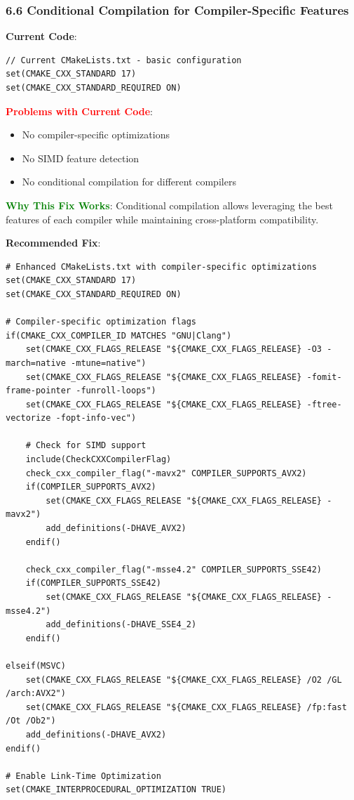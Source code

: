 \documentclass[11pt,a4paper]{article}
\begin{document}
\subsubsection{6.6 Conditional Compilation for Compiler-Specific Features}

\textbf{Current Code}:
\begin{lstlisting}
// Current CMakeLists.txt - basic configuration
set(CMAKE_CXX_STANDARD 17)
set(CMAKE_CXX_STANDARD_REQUIRED ON)
\end{lstlisting}

\textcolor{red}{\textbf{Problems with Current Code}}:
\begin{itemize}
    \item No compiler-specific optimizations
    \item No SIMD feature detection
    \item No conditional compilation for different compilers
\end{itemize}

\textcolor{green}{\textbf{Why This Fix Works}}: Conditional compilation allows leveraging the best features of each compiler while maintaining cross-platform compatibility.

\textbf{Recommended Fix}:
\begin{lstlisting}
# Enhanced CMakeLists.txt with compiler-specific optimizations
set(CMAKE_CXX_STANDARD 17)
set(CMAKE_CXX_STANDARD_REQUIRED ON)

# Compiler-specific optimization flags
if(CMAKE_CXX_COMPILER_ID MATCHES "GNU|Clang")
    set(CMAKE_CXX_FLAGS_RELEASE "${CMAKE_CXX_FLAGS_RELEASE} -O3 -march=native -mtune=native")
    set(CMAKE_CXX_FLAGS_RELEASE "${CMAKE_CXX_FLAGS_RELEASE} -fomit-frame-pointer -funroll-loops")
    set(CMAKE_CXX_FLAGS_RELEASE "${CMAKE_CXX_FLAGS_RELEASE} -ftree-vectorize -fopt-info-vec")
    
    # Check for SIMD support
    include(CheckCXXCompilerFlag)
    check_cxx_compiler_flag("-mavx2" COMPILER_SUPPORTS_AVX2)
    if(COMPILER_SUPPORTS_AVX2)
        set(CMAKE_CXX_FLAGS_RELEASE "${CMAKE_CXX_FLAGS_RELEASE} -mavx2")
        add_definitions(-DHAVE_AVX2)
    endif()
    
    check_cxx_compiler_flag("-msse4.2" COMPILER_SUPPORTS_SSE42)
    if(COMPILER_SUPPORTS_SSE42)
        set(CMAKE_CXX_FLAGS_RELEASE "${CMAKE_CXX_FLAGS_RELEASE} -msse4.2")
        add_definitions(-DHAVE_SSE4_2)
    endif()
    
elseif(MSVC)
    set(CMAKE_CXX_FLAGS_RELEASE "${CMAKE_CXX_FLAGS_RELEASE} /O2 /GL /arch:AVX2")
    set(CMAKE_CXX_FLAGS_RELEASE "${CMAKE_CXX_FLAGS_RELEASE} /fp:fast /Ot /Ob2")
    add_definitions(-DHAVE_AVX2)
endif()

# Enable Link-Time Optimization
set(CMAKE_INTERPROCEDURAL_OPTIMIZATION TRUE)
\end{lstlisting}
\end{document}
